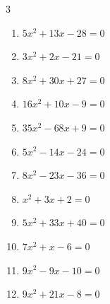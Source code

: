 \begin{multicols}{3}
\begin{enumerate}

  \item $5x^{2}+13x-28=0$


  \item $3x^{2}+2x-21=0$


  \item $8x^{2}+30x+27=0$


  \item $16x^{2}+10x-9=0$


  \item $35x^{2}-68x+9=0$


\columnbreak %

\resetques

  \item $5x^{2}-14x-24=0$


  \item $8x^{2}-23x-36=0$


  \item $x^{2}+3x+2=0$

        \phantom{$\displaystyle x=-1,\; -2$}

  \item $5x^{2}+33x+40=0$


  \item $7x^{2}+x-6=0$


  \item $9x^{2}-9x-10=0$


  \item $9x^{2}+21x-8=0$



\end{enumerate}
\end{multicols}
